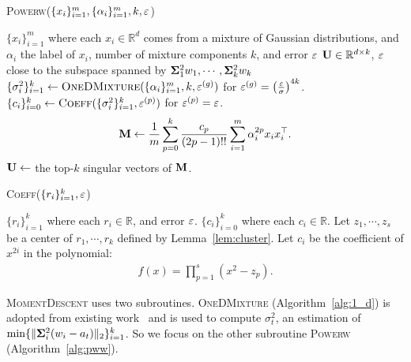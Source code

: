 \begin{algorithm}[!t]
\caption{ \textsc{Powerw}($\{ x_i \}_{i = 1}^m, \{ \alpha_i \}_{i = 1}^m, k,  \varepsilon$) \label{alg:pww}}
\begin{algorithmic}[1]
\REQUIRE  $\{ x_i \}_{i = 1}^m$ where each $x_i \in \mathbb{R}^d$ comes from a mixture of Gaussian distributions, and $\alpha_i$ the label of $x_i$, number of mixture components $k$, and error $\varepsilon$
\ENSURE $\bold{U} \in \mathbb{R}^{d \times k}$, $\varepsilon$ close to the subspace spanned by $\bold{\Sigma}_1^2 w_1, \cdots, \bold{\Sigma}_k^2 w_k$
\STATE $\{ \sigma_i^2\}_{i = 1}^k \leftarrow \textsc{OneDMixture} ( \{ \alpha_i \}_{i = 1}^m, k,  \varepsilon^{(g)})$ for $\varepsilon^{(g)} = \left(\frac{\varepsilon}{\sigma} \right)^{4k}  $.
\STATE $\{ c_i \}_{i = 0}^k \leftarrow \textsc{Coeff}(\{ \sigma_i^2 \}_{i = 1}^k, \varepsilon^{(p)})$ for $\varepsilon^{(p)} = \varepsilon$.
\STATE \begin{align}\bold{M} \leftarrow \frac{1}{m} \sum_{p = 0}^k \frac{c_p}{(2p - 1)!!}  \sum_{i = 1}^m \alpha_i^{2p} x_i x_i^{\top}.
\end{align}
\STATE $\bold{U} \leftarrow $ the top-$k$ singular vectors of $\bold{M}$.
\end{algorithmic}
\end{algorithm}



\begin{algorithm}[!t]
\caption{ \textsc{Coeff}($\{ r_i \}_{i = 1}^k, \varepsilon$) \label{alg:coeff}}
\begin{algorithmic}[1]
\REQUIRE  $\{ r_i \}_{i = 1}^k$ where each $r_i \in \mathbb{R}$, and error $\varepsilon$.
\ENSURE $\{ c_i \}_{i = 0}^k$ where each $c_i \in \mathbb{R}$.
\STATE Let $z_1, \cdots, z_s$ be a center of $r_1, \cdots, r_k$ defined by Lemma~\ref{lem:cluster}.
\STATE Let $c_i$ be the coefficient of $x^{2i}$ in the polynomial: \begin{align}
f(x) = \prod_{p = 1}^s (x^2 - z_p).
\end{align}
\end{algorithmic}
\end{algorithm}


\textsc{MomentDescent} uses two subroutines. \textsc{OneDMixture } (Algorithm~\ref{alg:1_d}) is adopted from existing work~\citep{moitra2010settling} and is used to compute $\sigma_t^2$, an estimation of $\min \{\|\bold{\Sigma}_i^2 (w_i - a_t)\|_2\}_{i=1}^k$. 
So we focus on the other subroutine \textsc{Powerw} (Algorithm~\ref{alg:pww}).

